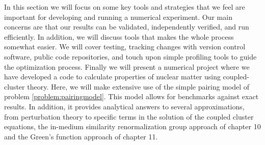 In this section we will focus on some key tools and strategies that we feel are
important for developing and running a numerical experiment. Our main concerns
are that our results can be validated, independently verified, and run
efficiently. In addition, we will discuss tools that makes the whole process somewhat easier. We will
cover testing, tracking changes with version control software, public code
repositories, and touch upon simple profiling tools to guide the optimization
process. Finally we will present a numerical project where we have developed a
code to calculate properties of nuclear matter using coupled-cluster
theory. Here, we will make extensive use of the simple pairing model of problem
\ref{problem:pairingmodel}. This model allows for benchmarks against exact
results. In addition, it provides analytical answers to several approximations,
from perturbation theory to specific terms in the solution of the coupled
cluster equations, the in-medium similarity renormalization group approach of
chapter 10 and the Green's function approach of chapter 11.


